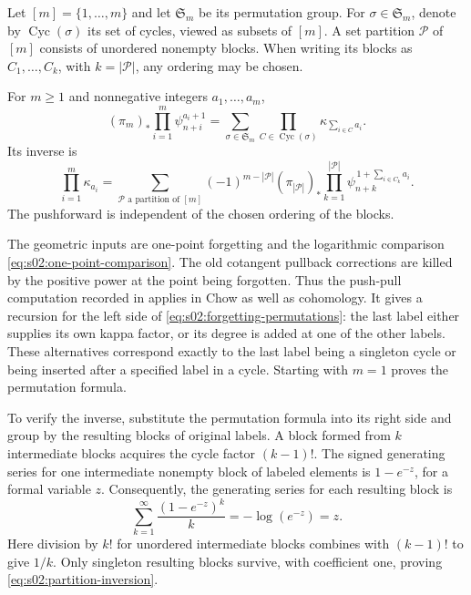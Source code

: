 Let $[m]=\{1,\ldots,m\}$ and let $\mathfrak S_m$ be its permutation
group.  For $\sigma\in\mathfrak S_m$, denote by
$\operatorname{Cyc}(\sigma)$ its set of cycles, viewed as subsets of
$[m]$.  A set partition $\mathcal P$ of $[m]$ consists of unordered
nonempty blocks.  When writing its blocks as $C_1,\ldots,C_k$, with
$k=|\mathcal P|$, any ordering may be chosen.

\begin{lmm}
\label{lmm:s02:forgetting-inversion}
For $m\geq1$ and nonnegative integers $a_1,\ldots,a_m$,
\begin{equation}
\label{eq:s02:forgetting-permutations}
(\pi_m)_*\prod_{i=1}^m\psi_{n+i}^{a_i+1}
=\sum_{\sigma\in\mathfrak S_m}
\prod_{C\in\operatorname{Cyc}(\sigma)}\kappa_{\sum_{i\in C}a_i}.
\end{equation}
Its inverse is
\begin{equation}
\label{eq:s02:partition-inversion}
\prod_{i=1}^m\kappa_{a_i}
=\sum_{\mathcal P\text{ a partition of }[m]}
(-1)^{m-|\mathcal P|}(\pi_{|\mathcal P|})_*
\prod_{k=1}^{|\mathcal P|}
\psi_{n+k}^{\,1+\sum_{i\in C_k}a_i}.
\end{equation}
The pushforward is independent of the chosen ordering of the blocks.
\end{lmm}

\begin{prf}
The geometric inputs are one-point forgetting and the logarithmic
comparison \eqref{eq:s02:one-point-comparison}.  The old cotangent
pullback corrections are killed by the positive power at the point
being forgotten.  Thus the push-pull computation recorded in
\cite[(2.9)--(2.11)]{KMZ96v1} applies in Chow as well as cohomology.
It gives a recursion for the left side of
\eqref{eq:s02:forgetting-permutations}: the last label either supplies
its own kappa factor, or its degree is added at one of the other
labels.  These alternatives correspond exactly to the last label
being a singleton cycle or being inserted after a specified label in
a cycle.  Starting with $m=1$ proves the permutation formula.

To verify the inverse, substitute the permutation formula into its
right side and group by the resulting blocks of original labels.  A
block formed from $k$ intermediate blocks acquires the cycle factor
$(k-1)!$.  The signed generating series for one intermediate nonempty
block of labeled elements is $1-e^{-z}$, for a formal variable $z$.
Consequently, the generating series for each resulting block is
\[
\sum_{k=1}^{\infty}\frac{(1-e^{-z})^k}{k}
=-\log(e^{-z})=z.
\]
Here division by $k!$ for unordered intermediate blocks combines with
$(k-1)!$ to give $1/k$.  Only singleton resulting blocks survive,
with coefficient one, proving \eqref{eq:s02:partition-inversion}.
\end{prf}


